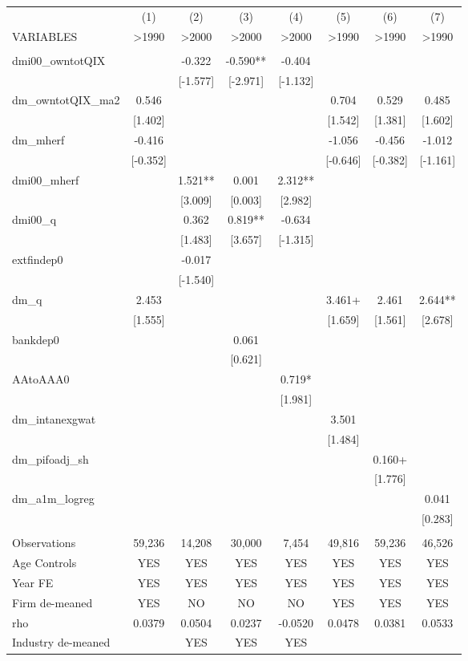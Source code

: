 \documentclass[]{article}
\begin{document}
\begin{tabular}{lccccccc} \hline
 & (1) & (2) & (3) & (4) & (5) & (6) & (7) \\
VARIABLES & >1990 & >2000 & >2000 & >2000 & >1990 & >1990 & >1990 \\ \hline
 &  &  &  &  &  &  &  \\
dmi00\_owntotQIX &  & -0.322 & -0.590** & -0.404 &  &  &  \\
 &  & [-1.577] & [-2.971] & [-1.132] &  &  &  \\
dm\_owntotQIX\_ma2 & 0.546 &  &  &  & 0.704 & 0.529 & 0.485 \\
 & [1.402] &  &  &  & [1.542] & [1.381] & [1.602] \\
dm\_mherf & -0.416 &  &  &  & -1.056 & -0.456 & -1.012 \\
 & [-0.352] &  &  &  & [-0.646] & [-0.382] & [-1.161] \\
dmi00\_mherf &  & 1.521** & 0.001 & 2.312** &  &  &  \\
 &  & [3.009] & [0.003] & [2.982] &  &  &  \\
dmi00\_q &  & 0.362 & 0.819** & -0.634 &  &  &  \\
 &  & [1.483] & [3.657] & [-1.315] &  &  &  \\
extfindep0 &  & -0.017 &  &  &  &  &  \\
 &  & [-1.540] &  &  &  &  &  \\
dm\_q & 2.453 &  &  &  & 3.461+ & 2.461 & 2.644** \\
 & [1.555] &  &  &  & [1.659] & [1.561] & [2.678] \\
bankdep0 &  &  & 0.061 &  &  &  &  \\
 &  &  & [0.621] &  &  &  &  \\
AAtoAAA0 &  &  &  & 0.719* &  &  &  \\
 &  &  &  & [1.981] &  &  &  \\
dm\_intanexgwat &  &  &  &  & 3.501 &  &  \\
 &  &  &  &  & [1.484] &  &  \\
dm\_pifoadj\_sh &  &  &  &  &  & 0.160+ &  \\
 &  &  &  &  &  & [1.776] &  \\
dm\_a1m\_logreg &  &  &  &  &  &  & 0.041 \\
 &  &  &  &  &  &  & [0.283] \\
 &  &  &  &  &  &  &  \\
Observations & 59,236 & 14,208 & 30,000 & 7,454 & 49,816 & 59,236 & 46,526 \\
Age Controls & YES & YES & YES & YES & YES & YES & YES \\
Year FE & YES & YES & YES & YES & YES & YES & YES \\
Firm de-meaned & YES & NO & NO & NO & YES & YES & YES \\
rho & 0.0379 & 0.0504 & 0.0237 & -0.0520 & 0.0478 & 0.0381 & 0.0533 \\
 Industry de-meaned &  & YES & YES & YES &  &  &  \\ \hline
\end{tabular}
\end{document}
